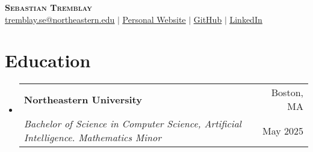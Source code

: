 \documentclass[letterpaper,11pt]{article}
\makeatletter
\newcommand{\resumeSubheading}[4]{
  \vspace{-2pt}\item
    \begin{tabular*}{1.00\textwidth}[t]{l@{\extracolsep{\fill}}r}
      \textbf{\small#1} & \small{#2} \\
      \textit{\small#3} & \small{#4} \\
    \end{tabular*}\vspace{-7pt}
}
\newcommand{\resumeSubHeadingListStart}{\begin{itemize}[leftmargin=0in, label={}]\vspace{-3pt}}
\newcommand{\resumeSubHeadingListEnd}{\end{itemize}}
\makeatother
\begin{document}

\begin{center}
    \textbf{\Huge \scshape Sebastian Tremblay} 
    \\ \vspace{1pt}
    \small
    \href{mailto:tremblay.se@northeastern.edu}{\uline{tremblay.se@northeastern.edu}} $|$
    \href{https://www.sebytremblay.com}{\uline{Personal Website}} $|$
    \href{https://github.com/sebytremblay}{\uline{GitHub}} $|$
    \href{https://www.linkedin.com/in/sebastiantremblay/}{\uline{LinkedIn}}
\end{center}

\section{Education}
  \resumeSubHeadingListStart
    \resumeSubheading
      {Northeastern University}{Boston, MA}
      {Bachelor of Science in Computer Science, Artificial Intelligence. Mathematics Minor}{May 2025}
    \vspace{-4pt}
  \resumeSubHeadingListEnd
\end{document}
